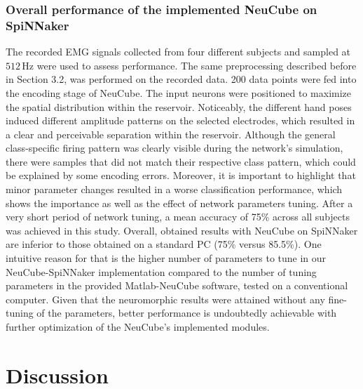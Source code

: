 \documentclass[journal,article,submit,moreauthors,pdftex,10pt,a4paper]{Definitions/mdpi}
\begin{document}
\subsubsection{Overall performance of the implemented NeuCube on SpiNNaker}
 The recorded EMG signals collected from four different subjects and sampled at $512\,\text{Hz}$ were used to assess performance. The same preprocessing described before in Section 3.2, was performed on the recorded data. 200 data points were fed into the encoding stage of NeuCube. The input neurons were positioned to maximize the spatial distribution within the reservoir. Noticeably, the different hand poses induced different amplitude patterns on the selected electrodes, which resulted  in a clear and perceivable separation within the reservoir. Although the general class-specific firing pattern was clearly visible during the network's simulation, there
were samples that did not match their respective class pattern, which could be explained by some encoding errors.
Moreover, it is important to highlight that minor parameter changes resulted in a worse classification performance, which shows the importance as well as the effect of network parameters tuning. 
After a very short period of network tuning, a mean accuracy of 75\% across all subjects was achieved in this study. 
Overall, obtained results with NeuCube on SpiNNaker are inferior to those obtained on a standard PC (75\% versus 85.5\%). One intuitive reason for that is the higher number of parameters to tune in our NeuCube-SpiNNaker implementation compared to the number of tuning parameters  in the provided Matlab-NeuCube software, tested on a conventional computer. Given that the neuromorphic results were attained without any fine-tuning of the parameters, better performance is undoubtedly achievable with further optimization of the NeuCube's implemented modules.



\section{Discussion}
\end{document}
